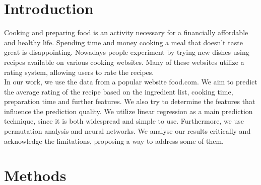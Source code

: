 \documentclass{article}
\begin{document}
\section{Introduction}
Cooking and preparing food is an activity necessary for a financially affordable and healthy life. Spending time and money cooking a meal that doesn't taste great is disappointing. Nowadays people experiment by trying new dishes using recipes available on various cooking websites. Many of these websites utilize a rating system, allowing users to rate the recipes. \\
In our work, we use the data from a popular website food.com. We aim to predict the average rating of the recipe based on the ingredient list, cooking time, preparation time and further features. We also try to determine the features that influence the prediction quality. We utilize linear regression as a main prediction technique, since it is both widespread and simple to use. Furthermore, we use permutation analysis and neural networks. We analyse our results critically and acknowledge the limitations, proposing a way to address some of them. 

\section{Methods}
\end{document}
